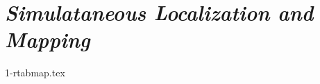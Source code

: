 \section{\emph{Simulataneous Localization and Mapping}}
\label{sec:slam}

\textcolor{red}{\lipsum[1-2]}

{1-rtabmap.tex}
